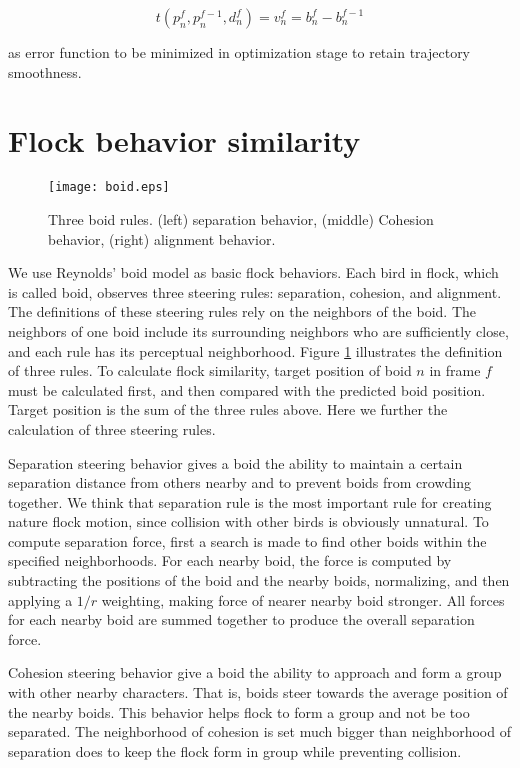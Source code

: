 \begin{equation}\label{eq:4}
 t(p_n^f, p_n^{f-1},d_n^f) = v_n^f = b_n^f-b_n^{f-1}
\end{equation}

as error function to be minimized in optimization stage to retain trajectory smoothness.


\section{Flock behavior similarity}


\begin{figure}[h]
 \begin{center}
  \texttt{[image: boid.eps]}
 \end{center}
 \caption{Three boid rules. (left) separation behavior, (middle) Cohesion behavior, (right) alignment behavior.}
 \label{figure:boid}
\end{figure}


We use Reynolds' boid model as basic flock behaviors. Each bird in flock, which is called boid, observes three steering rules: separation, cohesion, and alignment. The definitions of these steering rules rely on the neighbors of the boid. The neighbors of one boid include its surrounding neighbors who are sufficiently close, and each rule has its perceptual neighborhood. Figure \ref{figure:boid} illustrates the definition of three rules. To calculate flock similarity, target position of boid $n$ in frame $f$ must be calculated first, and then compared with the predicted boid position. Target position is the sum of the three rules above. Here we further the calculation of three steering rules.


Separation steering behavior gives a boid the ability to maintain a certain separation distance from others nearby and to prevent boids from crowding together. We think that separation rule is the most important rule for creating nature flock motion, since collision with other birds is obviously unnatural. To compute separation force, first a search is made to find other boids within the specified neighborhoods. For each nearby boid, the force is computed by subtracting the positions of the boid and the nearby boids, normalizing, and then applying a $1/r$ weighting, making force of nearer nearby boid stronger. All forces for each nearby boid are summed together to produce the overall separation force.


Cohesion steering behavior give a boid the ability to approach and form a group with other nearby characters. That is, boids steer towards the average position of the nearby boids. This behavior helps flock to form a group and not be too separated. The neighborhood of cohesion is set much bigger than neighborhood of separation does to keep the flock form in group while preventing collision.


